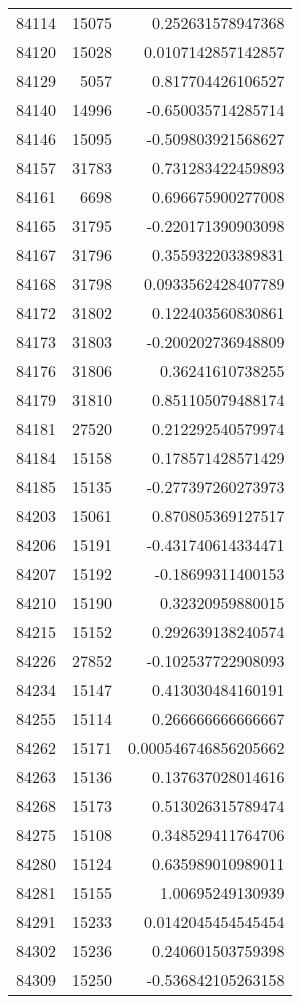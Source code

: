 \begin{tabular}{r | r | r}
84114 & 15075 & 0.252631578947368 \\
84120 & 15028 & 0.0107142857142857 \\
84129 & 5057 & 0.817704426106527 \\
84140 & 14996 & -0.650035714285714 \\
84146 & 15095 & -0.509803921568627 \\
84157 & 31783 & 0.731283422459893 \\
84161 & 6698 & 0.696675900277008 \\
84165 & 31795 & -0.220171390903098 \\
84167 & 31796 & 0.355932203389831 \\
84168 & 31798 & 0.0933562428407789 \\
84172 & 31802 & 0.122403560830861 \\
84173 & 31803 & -0.200202736948809 \\
84176 & 31806 & 0.36241610738255 \\
84179 & 31810 & 0.851105079488174 \\
84181 & 27520 & 0.212292540579974 \\
84184 & 15158 & 0.178571428571429 \\
84185 & 15135 & -0.277397260273973 \\
84203 & 15061 & 0.870805369127517 \\
84206 & 15191 & -0.431740614334471 \\
84207 & 15192 & -0.18699311400153 \\
84210 & 15190 & 0.32320959880015 \\
84215 & 15152 & 0.292639138240574 \\
84226 & 27852 & -0.102537722908093 \\
84234 & 15147 & 0.413030484160191 \\
84255 & 15114 & 0.266666666666667 \\
84262 & 15171 & 0.000546746856205662 \\
84263 & 15136 & 0.137637028014616 \\
84268 & 15173 & 0.513026315789474 \\
84275 & 15108 & 0.348529411764706 \\
84280 & 15124 & 0.635989010989011 \\
84281 & 15155 & 1.00695249130939 \\
84291 & 15233 & 0.0142045454545454 \\
84302 & 15236 & 0.240601503759398 \\
84309 & 15250 & -0.536842105263158 \\

\end{tabular}
